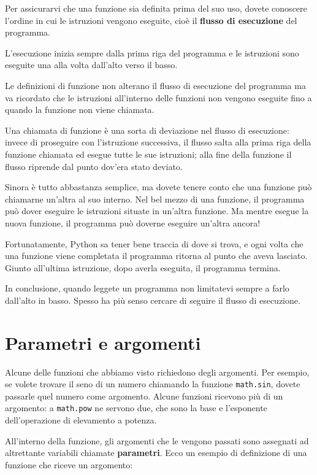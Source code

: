 \documentclass[10pt]{book}
\begin{document}
Per assicurarvi che una funzione sia definita prima del suo uso, dovete conoscere l'ordine in cui le istruzioni vengono eseguite, cioè il {\bf flusso di esecuzione} del programma.

L'esecuzione inizia sempre dalla prima riga del programma e le istruzioni sono eseguite una alla volta dall'alto verso il basso.

Le definizioni di funzione non alterano il flusso di esecuzione del programma ma va ricordato che le istruzioni all'interno delle funzioni non vengono eseguite fino a quando la funzione non viene chiamata. 

Una chiamata di funzione è una sorta di deviazione nel flusso di esecuzione: invece di proseguire con l'istruzione successiva, il flusso salta alla prima riga della funzione chiamata ed esegue tutte le sue istruzioni; alla fine della funzione il flusso riprende dal punto dov'era stato deviato.

Sinora è tutto abbastanza semplice, ma dovete tenere conto che una funzione può chiamarne un'altra al suo interno. Nel bel mezzo di una funzione, il programma può dover eseguire le istruzioni situate in un'altra funzione. Ma mentre esegue la nuova funzione, il programma può doverne eseguire un'altra ancora!

Fortunatamente, Python sa tener bene traccia di dove si trova, e ogni volta che una funzione viene completata il programma ritorna al punto che aveva lasciato. Giunto all'ultima istruzione, dopo averla eseguita, il programma termina.

In conclusione, quando leggete un programma non limitatevi sempre a farlo dall'alto in basso. Spesso ha più senso cercare di seguire il flusso di esecuzione.


\section{Parametri e argomenti}
\label{parametri}

Alcune delle funzioni che abbiamo visto richiedono degli argomenti. Per esempio, se volete trovare il seno di un numero chiamando la funzione {\tt math.sin}, dovete passarle quel numero come argomento. Alcune funzioni ricevono più di un argomento: a {\tt math.pow} ne servono due, che sono la base e l'esponente dell'operazione di elevamento a potenza. 

All'interno della funzione, gli argomenti che le vengono passati sono assegnati ad altrettante variabili chiamate {\bf parametri}. Ecco un esempio di definizione di una funzione che riceve un argomento:
\end{document}
